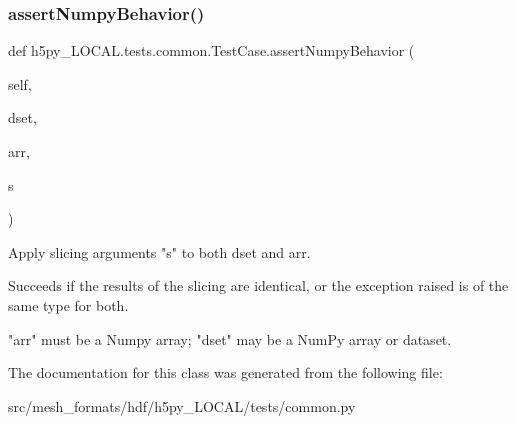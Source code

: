 \subsubsection{\texorpdfstring{assert\+Numpy\+Behavior()}{assertNumpyBehavior()}}
{\footnotesize\ttfamily def h5py\+\_\+\+L\+O\+C\+A\+L.\+tests.\+common.\+Test\+Case.\+assert\+Numpy\+Behavior (\begin{DoxyParamCaption}\item[{}]{self,  }\item[{}]{dset,  }\item[{}]{arr,  }\item[{}]{s }\end{DoxyParamCaption})}

\begin{DoxyVerb}Apply slicing arguments "s" to both dset and arr.

Succeeds if the results of the slicing are identical, or the
exception raised is of the same type for both.

"arr" must be a Numpy array; "dset" may be a NumPy array or dataset.
\end{DoxyVerb}
 

The documentation for this class was generated from the following file\+:\begin{DoxyCompactItemize}
\item 
src/mesh\+\_\+formats/hdf/h5py\+\_\+\+L\+O\+C\+A\+L/tests/common.\+py\end{DoxyCompactItemize}
